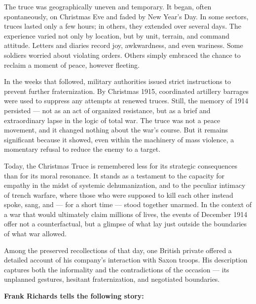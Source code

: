 The truce was geographically uneven and temporary. It began, often spontaneously, on Christmas Eve and faded by New Year’s Day. In some sectors, truces lasted only a few hours; in others, they extended over several days. The experience varied not only by location, but by unit, terrain, and command attitude. Letters and diaries record joy, awkwardness, and even wariness. Some soldiers worried about violating orders. Others simply embraced the chance to reclaim a moment of peace, however fleeting.

In the weeks that followed, military authorities issued strict instructions to prevent further fraternization. By Christmas 1915, coordinated artillery barrages were used to suppress any attempts at renewed truces. Still, the memory of 1914 persisted — not as an act of organized resistance, but as a brief and extraordinary lapse in the logic of total war. The truce was not a peace movement, and it changed nothing about the war’s course. But it remains significant because it showed, even within the machinery of mass violence, a momentary refusal to reduce the enemy to a target.

Today, the Christmas Truce is remembered less for its strategic consequences than for its moral resonance. It stands as a testament to the capacity for empathy in the midst of systemic dehumanization, and to the peculiar intimacy of trench warfare, where those who were supposed to kill each other instead spoke, sang, and — for a short time — stood together unarmed. In the context of a war that would ultimately claim millions of lives, the events of December 1914 offer not a counterfactual, but a glimpse of what lay just outside the boundaries of what war allowed.

Among the preserved recollections of that day, one British private offered a detailed account of his company’s interaction with Saxon troops. His description captures both the informality and the contradictions of the occasion — its unplanned gestures, hesitant fraternization, and negotiated boundaries.

\vspace{0.5em}

\textbf{Frank Richards tells the following story:}


